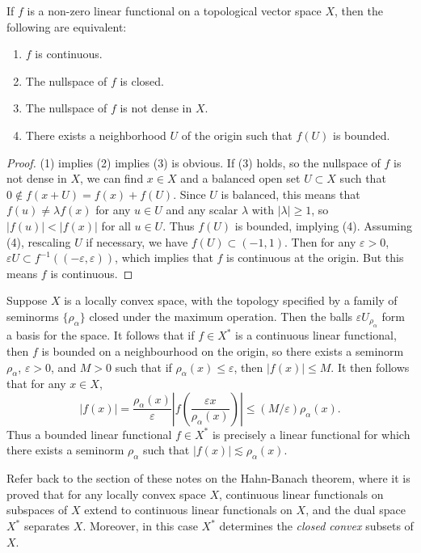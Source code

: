\begin{theorem}
    If $f$ is a non-zero linear functional on a topological vector space $X$, then the following are equivalent:
    \begin{enumerate}
        \item $f$ is continuous.
        \item The nullspace of $f$ is closed.
        \item The nullspace of $f$ is not dense in $X$.
        \item There exists a neighborhood $U$ of the origin such that $f(U)$ is bounded.
    \end{enumerate}
\end{theorem}
\begin{proof}
    (1) implies (2) implies (3) is obvious. If (3) holds, so the nullspace of $f$ is not dense in $X$, we can find $x \in X$ and a balanced open set $U \subset X$ such that $0 \not \in f(x + U) = f(x) + f(U)$. Since $U$ is balanced, this means that $f(u) \neq \lambda f(x)$ for any $u \in U$ and any scalar $\lambda$ with $|\lambda| \geq 1$, so $|f(u)| < |f(x)|$ for all $u \in U$. Thus $f(U)$ is bounded, implying (4). Assuming (4), rescaling $U$ if necessary, we have $f(U) \subset (-1,1)$. Then for any $\varepsilon > 0$, $\varepsilon U \subset f^{-1}((-\varepsilon,\varepsilon))$, which implies that $f$ is continuous at the origin. But this means $f$ is continuous.
\end{proof}

\begin{example}
    Suppose $X$ is a locally convex space, with the topology specified by a family of seminorms $\{ \rho_\alpha \}$ closed under the maximum operation. Then the balls $\varepsilon U_{\rho_\alpha}$ form a basis for the space. It follows that if $f \in X^*$ is a continuous linear functional, then $f$ is bounded on a neighbourhood on the origin, so there exists a seminorm $\rho_\alpha$, $\varepsilon > 0$, and $M > 0$ such that if $\rho_\alpha(x) \leq \varepsilon$, then $|f(x)| \leq M$. It then follows that for any $x \in X$,
    \[ |f(x)| = \frac{\rho_\alpha(x)}{\varepsilon} \left| f \left( \frac{\varepsilon x}{\rho_\alpha(x)} \right) \right| \leq (M/\varepsilon) \rho_\alpha(x). \]
    Thus a bounded linear functional $f \in X^*$ is precisely a linear functional for which there exists a seminorm $\rho_\alpha$ such that $|f(x)| \lesssim \rho_\alpha(x)$.
\end{example}

Refer back to the section of these notes on the Hahn-Banach theorem, where it is proved that for any locally convex space $X$, continuous linear functionals on subspaces of $X$ extend to continuous linear functionals on $X$, and the dual space $X^*$ separates $X$. Moreover, in this case $X^*$ determines the \emph{closed convex} subsets of $X$.

